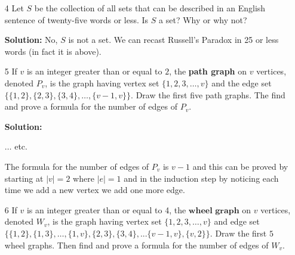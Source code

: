 \documentclass{article}
\newcommand\abs[1]{\left|#1\right|}
\begin{document}
\begin{enumerate}
\item[4] Let $S$ be the collection of all sets that can be described in an English sentence of twenty-five words or less. Is $S$ a set? Why or why not?

\textbf{Solution:} No, $S$ is not a set. We can recast Russell's Paradox in 25 or less words (in fact it is above).

\item[5] If $v$ is an integer greater than or equal to $2$, the \textbf{path graph} on $v$ vertices, denoted $P_v$, is the graph having vertex set $\{1, 2, 3, \ldots, v\}$ and the edge set $\{ \{1, 2\}, \{2, 3\}, \{3, 4\}, \ldots, \{v - 1, v\} \}$. Draw the first five path graphs. The find and prove a formula for the number of edges of $P_v$.

\textbf{Solution:}


$\ldots$ etc.

The formula for the number of edges of $P_v$ is $v - 1$ and this can be proved by starting at $\abs{v} = 2$ where $\abs{e} = 1$ and in the induction step by noticing each time we add a new vertex we add one more edge.

\item[6] If $v$ is an integer greater than or equal to 4, the $\textbf{wheel graph}$ on $v$ vertices, denoted $W_v$, is the graph having vertex set $\{1, 2, 3, \ldots, v\}$ and edge set $\{ \{1, 2\}, \{1, 3\}, \ldots, \{1, v\}, \{2, 3\}, \{3, 4\}, ... \{v - 1, v\}, \{v, 2\} \}$. Draw the first $5$ wheel graphs. Then find and prove a formula for the number of edges of $W_v$.


\end{enumerate}
\end{document}
